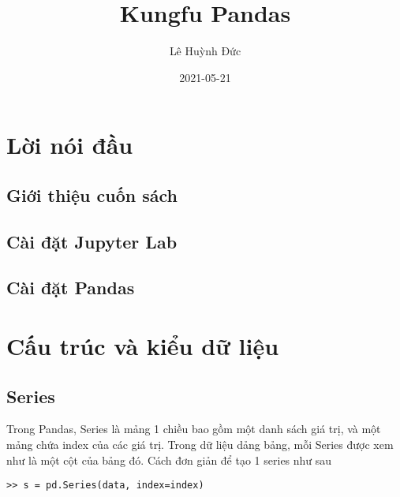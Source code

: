 \documentclass[
]{book}
\title{Kungfu Pandas}
\author{Lê Huỳnh Đức}
\date{2021-05-21}
\begin{document}
\maketitle

{
\setcounter{tocdepth}{1}
\tableofcontents
}
\hypertarget{lux1eddi-nuxf3i-ux111ux1ea7u}{%
\chapter*{Lời nói đầu}\label{lux1eddi-nuxf3i-ux111ux1ea7u}}

\hypertarget{giux1edbi-thiux1ec7u-cuux1ed1n-suxe1ch}{%
\section*{Giới thiệu cuốn sách}\label{giux1edbi-thiux1ec7u-cuux1ed1n-suxe1ch}}

\hypertarget{cuxe0i-ux111ux1eb7t-jupyter-lab}{%
\section*{Cài đặt Jupyter Lab}\label{cuxe0i-ux111ux1eb7t-jupyter-lab}}

\hypertarget{cuxe0i-ux111ux1eb7t-pandas}{%
\section*{Cài đặt Pandas}\label{cuxe0i-ux111ux1eb7t-pandas}}

\hypertarget{cux1ea5u-truxfac-vuxe0-kiux1ec3u-dux1eef-liux1ec7u}{%
\chapter{Cấu trúc và kiểu dữ liệu}\label{cux1ea5u-truxfac-vuxe0-kiux1ec3u-dux1eef-liux1ec7u}}

\hypertarget{series}{%
\section{Series}\label{series}}

Trong Pandas, Series là mảng 1 chiều bao gồm một danh sách giá trị, và một mảng chứa index của các giá trị. Trong dữ liệu dảng bảng, mỗi Series được xem như là một cột của bảng đó. Cách đơn giản để tạo 1 series như sau

\begin{verbatim}
>> s = pd.Series(data, index=index)
\end{verbatim}
\end{document}
